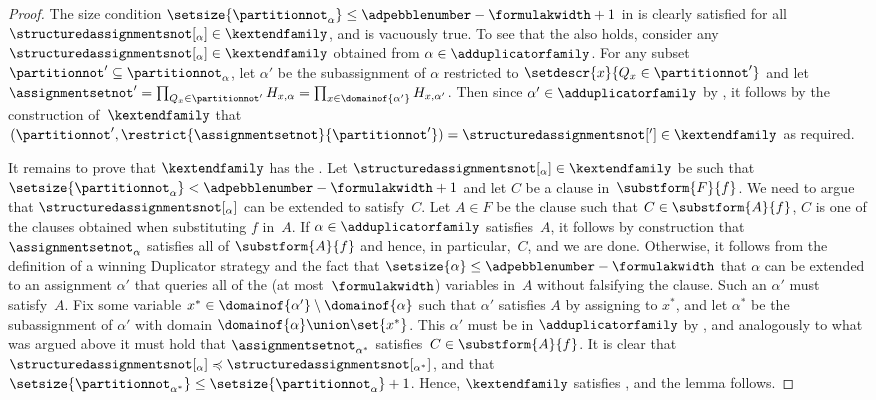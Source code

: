 \documentclass{toc}
\begin{document}
\begin{proof}
  The size condition
  $\setsize{\partitionnot_\alpha} \leq  \adpebblenumber - \formulakwidth + 1$ 
  in
  is clearly satisfied for all
  $\structuredassignmentsnot[_\alpha] \in \kextendfamily$, 
  and \respectfulness is vacuously true.
  To see that the \restrictionproperty{} also holds,
%
%
%
  consider any
  \mbox{$\structuredassignmentsnot[_\alpha] \in \kextendfamily$} 
  obtained from $\alpha \in \adduplicatorfamily$.
  For any subset 
  $\partitionnot' \subseteq \partitionnot_\alpha$, 
  let
  $\alpha'$
  be the subassignment of 
  $\alpha$
  restricted to 
  $\setdescr{x}{Q_x \in \partitionnot'}$
%
  and let
  $
  \assignmentsetnot' = 
  \prod_{Q_x \in \partitionnot'} H_{x,\alpha} =
  \prod_{x \in \domainof{\alpha'}} H_{x,\alpha'}
  $.
  Then since
  $\alpha' \in \adduplicatorfamily$
  by
 ,  
  it follows by the construction of~$\kextendfamily$
  that
  $
  (\partitionnot', \restrict{\assignmentsetnot}{\partitionnot'})
  =
  \structuredassignmentsnot[']
  \in
  \kextendfamily$
  as required.
%
%
%
%
%
%
%
%
%
%
%
%


  It 
%
  remains to prove that $\kextendfamily$ has the
  \extensionproperty{}. 
%
%
%
%
%
%
%
  Let $\structuredassignmentsnot[_\alpha] \in \kextendfamily$ be 
  such that
  $\setsize{\partitionnot_\alpha} < \adpebblenumber - \formulakwidth + 1$ 
  and
%
  let 
  $C$ be a clause in~$\substform{F}{f}$.
  We need to argue that 
  $\structuredassignmentsnot[_\alpha]$
  can be extended to satisfy~$C$.
%
  Let 
  $A \in F$
  be the clause such that
  $C \in \substform{A}{f}$,
  \ieComma $C$ is one of the clauses
  obtained when substituting
%
  $f$ in~$A$. 
  If
  $\alpha \in \adduplicatorfamily$ 
  satisfies~$A$, it follows by construction that 
  $\assignmentsetnot_\alpha$
  satisfies all of 
  $\substform{A}{f}$ 
  and hence, in particular,~$C$, and we are done.
  Otherwise, 
%
%
%
%
%
%
%
%
  it follows
  from the definition 
  of a winning Duplicator strategy and the
  fact that $\setsize{\alpha} \leq \adpebblenumber - \formulakwidth$
  that $\alpha$ can be extended to an assignment $\alpha'$
%
%
%
  that queries all of the (at most~$\formulakwidth$) variables in~$A$ 
  without falsifying the clause. Such an $\alpha'$ must satisfy~$A$.
  Fix some variable
  $x^* \in \domainof{\alpha'} \setminus \domainof{\alpha}$
  such that $\alpha'$ satisfies $A$ by assigning to $x^*$,
  and let
  $\alpha^*$ be the subassignment of $\alpha'$
  with domain
  $\domainof{\alpha} \union \set{x^*}$.
%
%
%
%
%
%
%
%
%
%
%
%
%
%
%
  This $\alpha'$ must be in $\adduplicatorfamily$ by
 ,  
  and analogously to what was argued above it must hold that
  $\assignmentsetnot_{\alpha^*}$
  satisfies~$C \in \substform{A}{f}$.
  It is clear that
  $\structuredassignmentsnot[_{\alpha}] 
  \preccurlyeq 
  \structuredassignmentsnot[_{\alpha^*}]$,
  and that
  $\setsize{\partitionnot_{\alpha^*}} \leq
  \setsize{\partitionnot_\alpha} + 1$.
  Hence, 
  $\kextendfamily$ satisfies
  \extensionpropname, and the lemma follows.
\end{proof}
\end{document}
